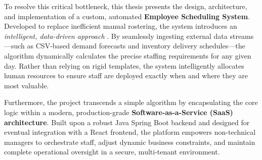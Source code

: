 \documentclass[12pt]{report}
\begin{document}
To resolve this critical bottleneck, this thesis presents the design, architecture, and implementation of a custom, automated \textbf{Employee Scheduling System}. Developed to replace inefficient manual rostering, the system introduces an \emph{intelligent, data-driven approach} \cite{RetailIncomeScheduling}. By seamlessly ingesting external data streams—such as CSV-based demand forecasts and inventory delivery schedules—the algorithm dynamically calculates the precise staffing requirements for any given day. Rather than relying on rigid templates, the system intelligently allocates human resources to ensure staff are deployed exactly when and where they are most valuable.

Furthermore, the project transcends a simple algorithm by encapsulating the core logic within a modern, production-grade \textbf{Software-as-a-Service (SaaS) architecture}. Built upon a robust Java Spring Boot backend and designed for eventual integration with a React frontend, the platform empowers non-technical managers to orchestrate staff, adjust dynamic business constraints, and maintain complete operational oversight in a secure, multi-tenant environment.




\tableofcontents


\newpage
{}













\end{document}
